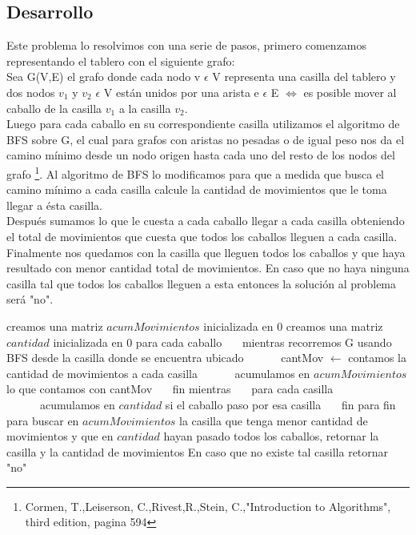 \subsection{Desarrollo}

Este problema lo resolvimos con una serie de pasos, primero comenzamos representando el tablero con el siguiente grafo: \\
Sea G(V,E) el grafo donde cada nodo v $\epsilon$ V representa una casilla del tablero y dos nodos $v_1$ y $v_2$ $\epsilon$ V están unidos por una arista e $\epsilon$ E $\Leftrightarrow$ es posible mover al caballo de la casilla $v_1$ a la casilla $v_2$. \\
Luego para cada caballo en su correspondiente casilla utilizamos el algoritmo de BFS sobre G, el cual para grafos con aristas no pesadas o de igual peso nos da el camino mínimo desde un nodo origen hasta cada uno del resto de los nodos del grafo \footnote{Cormen, T.,Leiserson, C.,Rivest,R.,Stein, C.,"Introduction to Algorithms", third edition, pagina 594}. Al algoritmo de BFS lo modificamos para que a medida que busca el camino mínimo a cada casilla calcule la cantidad de movimientos que le toma llegar a ésta casilla. \\
Después sumamos lo que le cuesta a cada caballo llegar a cada casilla obteniendo el total de movimientos que cuesta que todos los caballos lleguen a cada casilla. Finalmente nos quedamos con la casilla que lleguen todos los caballos y que haya resultado con menor cantidad total de movimientos. En caso que no haya ninguna casilla tal que todos los caballos lleguen a esta entonces la solución al problema será "no".



\begin{codebox}
\li	creamos una matriz $acumMovimientos$ inicializada en 0
\li	creamos una matriz $cantidad$ inicializada en 0
\li	
\li	para cada caballo 
\li \ \ \	mientras recorremos G usando BFS desde la casilla donde se encuentra ubicado
\li	\ \ \ \ \ \		cantMov $\leftarrow$ contamos la cantidad de movimientos a cada casilla
\li	\ \ \ \ \ \		acumulamos en $acumMovimientos$ lo que contamos con cantMov
\li \ \ \	fin mientras
\li \ \ \	para cada casilla
\li	\ \ \ \ \ \		acumulamos en $cantidad$ si el caballo paso por esa casilla
\li \ \ \	fin para
\li	fin para
\li	
\li	buscar en $acumMovimientos$ la casilla que tenga menor cantidad de movimientos y que en $cantidad$
\li hayan pasado todos los caballos, retornar la casilla y la cantidad de movimientos
\li 
\li En caso que no existe tal casilla retornar "no"
\end{codebox}




